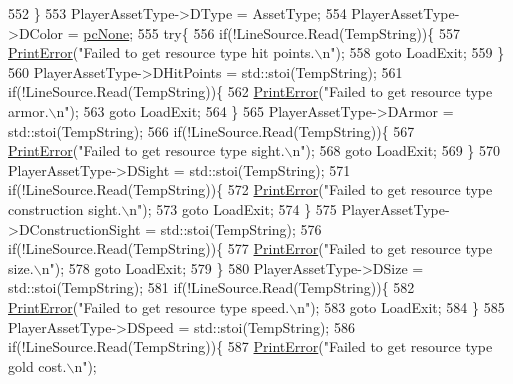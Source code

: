 \begin{DoxyCode}
{552     \}
553     PlayerAssetType->DType = AssetType;
554     PlayerAssetType->DColor = \hyperlink{GameDataTypes_8h_aafb0ca75933357ff28a6d7efbdd7602fa88767aa8e02c7b3192bbab4127b3d729}{pcNone};
555     \textcolor{keywordflow}{try}\{
556         \textcolor{keywordflow}{if}(!LineSource.Read(TempString))\{
557             \hyperlink{Debug_8h_a2ed825eefefe35baf59a93a8c641323d}{PrintError}(\textcolor{stringliteral}{"Failed to get resource type hit points.\(\backslash\)n"});
558             \textcolor{keywordflow}{goto} LoadExit;
559         \}
560         PlayerAssetType->DHitPoints = std::stoi(TempString);
561         \textcolor{keywordflow}{if}(!LineSource.Read(TempString))\{
562             \hyperlink{Debug_8h_a2ed825eefefe35baf59a93a8c641323d}{PrintError}(\textcolor{stringliteral}{"Failed to get resource type armor.\(\backslash\)n"});
563             \textcolor{keywordflow}{goto} LoadExit;
564         \}
565         PlayerAssetType->DArmor = std::stoi(TempString);
566         \textcolor{keywordflow}{if}(!LineSource.Read(TempString))\{
567             \hyperlink{Debug_8h_a2ed825eefefe35baf59a93a8c641323d}{PrintError}(\textcolor{stringliteral}{"Failed to get resource type sight.\(\backslash\)n"});
568             \textcolor{keywordflow}{goto} LoadExit;
569         \}
570         PlayerAssetType->DSight = std::stoi(TempString);
571         \textcolor{keywordflow}{if}(!LineSource.Read(TempString))\{
572             \hyperlink{Debug_8h_a2ed825eefefe35baf59a93a8c641323d}{PrintError}(\textcolor{stringliteral}{"Failed to get resource type construction sight.\(\backslash\)n"});
573             \textcolor{keywordflow}{goto} LoadExit;
574         \}
575         PlayerAssetType->DConstructionSight = std::stoi(TempString);
576         \textcolor{keywordflow}{if}(!LineSource.Read(TempString))\{
577             \hyperlink{Debug_8h_a2ed825eefefe35baf59a93a8c641323d}{PrintError}(\textcolor{stringliteral}{"Failed to get resource type size.\(\backslash\)n"});
578             \textcolor{keywordflow}{goto} LoadExit;
579         \}
580         PlayerAssetType->DSize = std::stoi(TempString);
581         \textcolor{keywordflow}{if}(!LineSource.Read(TempString))\{
582             \hyperlink{Debug_8h_a2ed825eefefe35baf59a93a8c641323d}{PrintError}(\textcolor{stringliteral}{"Failed to get resource type speed.\(\backslash\)n"});
583             \textcolor{keywordflow}{goto} LoadExit;
584         \}
585         PlayerAssetType->DSpeed = std::stoi(TempString);
586         \textcolor{keywordflow}{if}(!LineSource.Read(TempString))\{
587             \hyperlink{Debug_8h_a2ed825eefefe35baf59a93a8c641323d}{PrintError}(\textcolor{stringliteral}{"Failed to get resource type gold cost.\(\backslash\)n"});
}
\end{DoxyCode}
